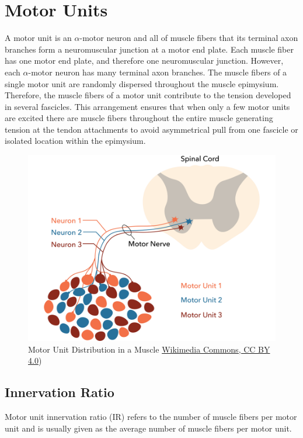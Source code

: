 \section{Motor Units}

A motor unit is an $\alpha$-motor neuron and all of muscle fibers that its terminal axon branches form a neuromuscular junction at a motor end plate. Each muscle fiber has one motor end plate, and therefore one neuromuscular junction. However, each $\alpha$-motor neuron has many terminal axon branches. The muscle fibers of a single motor unit are randomly dispersed throughout the muscle epimysium. Therefore, the muscle fibers of a motor unit contribute to the tension developed in several fascicles. This arrangement ensures that when only a few motor units are excited there are muscle fibers throughout the entire muscle generating tension at the tendon attachments to avoid asymmetrical pull from one fascicle or isolated location within the epimysium.

\begin{figure}[!ht]
    \centering
    \includegraphics[width=1\linewidth]{./figure/motor_unit.png}
    \caption{Motor Unit Distribution in a Muscle \footnotesize{\href{https://commons.wikimedia.org/wiki/File:Motor_unit.png}{Wikimedia Commons, CC BY 4.0})}}
    \label{fig:motor_unit}
\end{figure}

\subsection{Innervation Ratio}
Motor unit innervation ratio (IR) refers to the number of muscle fibers per motor unit and is usually given as the average number of muscle fibers per motor unit.

